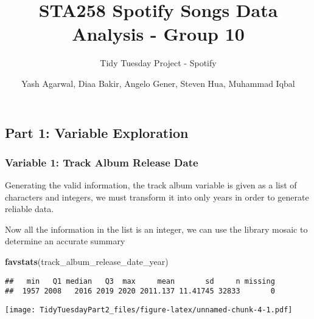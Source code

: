 \documentclass[
]{article}
\title{STA258 Spotify Songs Data Analysis - Group 10}
\subtitle{Tidy Tuesday Project - Spotify}
\author{Yash Agarwal, Diaa Bakir, Angelo Gener, Steven Hua, Muhammad Iqbal}
\date{}
\newenvironment{Shaded}{\begin{snugshade}}{\end{snugshade}}
\newcommand{\KeywordTok}[1]{\textcolor[rgb]{0.13,0.29,0.53}{\textbf{#1}}}
\newcommand{\NormalTok}[1]{#1}
\newcommand{\OperatorTok}[1]{\textcolor[rgb]{0.81,0.36,0.00}{\textbf{#1}}}
\newcommand{\StringTok}[1]{\textcolor[rgb]{0.31,0.60,0.02}{#1}}
\begin{document}
\maketitle

\hypertarget{part-1-variable-exploration}{%
\subsection{Part 1: Variable
Exploration}\label{part-1-variable-exploration}}

\hypertarget{variable-1-track-album-release-date}{%
\subsubsection{Variable 1: Track Album Release
Date}\label{variable-1-track-album-release-date}}

Generating the valid information, the track album variable is given as a
list of characters and integers, we must transform it into only years in
order to generate reliable data.

\begin{Shaded}
\end{Shaded}

Now all the information in the list is an integer, we can use the
library mosaic to determine an accurate summary

\begin{Shaded}
\begin{Highlighting}[]
\KeywordTok{favstats}\NormalTok{(track_album_release_date_year)}
\end{Highlighting}
\end{Shaded}

\begin{verbatim}
##   min   Q1 median   Q3  max     mean       sd     n missing
##  1957 2008   2016 2019 2020 2011.137 11.41745 32833       0
\end{verbatim}

\texttt{[image: TidyTuesdayPart2\_files/figure-latex/unnamed-chunk-4-1.pdf]}
\end{document}
